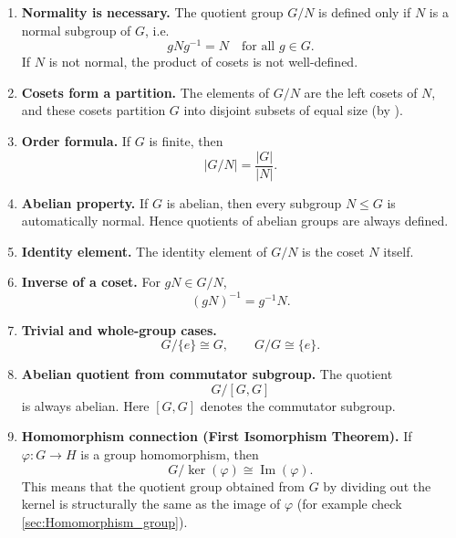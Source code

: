 \documentclass[a4paper,12pt]{article}
\theoremstyle{definition}
\begin{document}
\begin{enumerate}

\item \textbf{Normality is necessary.}  
The quotient group $G/N$ is defined only if $N$ is a normal subgroup of $G$, i.e.
\begin{equation*}
gNg^{-1} = N \quad \text{for all } g \in G.
\end{equation*}
If $N$ is not normal, the product of cosets is not well-defined.

\item \textbf{Cosets form a partition.}  
The elements of $G/N$ are the left cosets of $N$, and these cosets partition $G$ into disjoint subsets of equal size (by ).

\item \textbf{Order formula.}  
If $G$ is finite, then
\begin{equation*}
|G/N| = \frac{|G|}{|N|}.
\end{equation*}

\item \textbf{Abelian property.}  
If $G$ is abelian, then every subgroup $N \leq G$ is automatically normal. Hence quotients of abelian groups are always defined.

\item \textbf{Identity element.}  
The identity element of $G/N$ is the coset $N$ itself.

\item \textbf{Inverse of a coset.}  
For $gN \in G/N$,
\begin{equation*}
(gN)^{-1} = g^{-1}N.
\end{equation*}

\item \textbf{Trivial and whole-group cases.}
\begin{equation*}
G/\{e\} \cong G, \qquad G/G \cong \{e\}.
\end{equation*}

\item \textbf{Abelian quotient from commutator subgroup.}  
The quotient
\begin{equation*}
G/[G,G]
\end{equation*}
is always abelian. Here $[G,G]$ denotes the commutator subgroup.

\item \textbf{Homomorphism connection (First Isomorphism Theorem).}  
If $\varphi : G \to H$ is a group homomorphism, then
\begin{equation*}
G/\ker(\varphi) \cong \operatorname{Im}(\varphi).
\end{equation*}
This means that the quotient group obtained from $G$ by dividing out the kernel is structurally the same as the image of $\varphi$ (for example check \cref{sec:Homomorphism_group}).
\end{enumerate}
\end{document}

